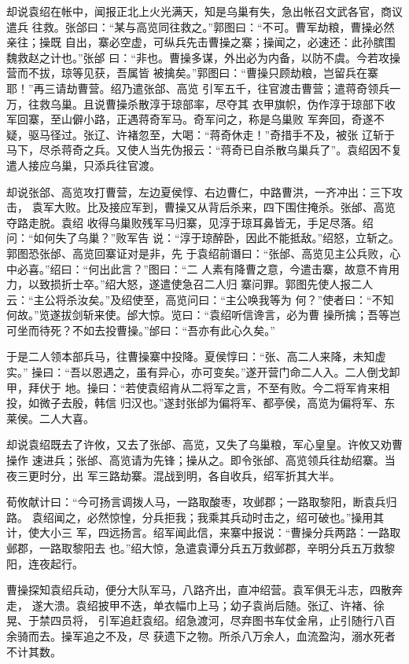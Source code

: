 却说袁绍在帐中，闻报正北上火光满天，知是乌巢有失，急出帐召文武各官，商议遣兵
往救。张郃曰：“某与高览同往救之。”郭图曰：“不可。曹军劫粮，曹操必然亲往；操既
自出，寨必空虚，可纵兵先击曹操之寨；操闻之，必速还：此孙膑围魏救赵之计也。”张邰
曰：“非也。曹操多谋，外出必为内备，以防不虞。今若攻操营而不拔，琼等见获，吾属皆
被擒矣。”郭图曰：“曹操只顾劫粮，岂留兵在寨耶！”再三请劫曹营。绍乃遣张郃、高览
引军五千，往官渡击曹营；遣蒋奇领兵一万，往救乌巢。且说曹操杀散淳于琼部率，尽夺其
衣甲旗帜，伪作淳于琼部下收军回寨，至山僻小路，正遇蒋奇军马。奇军问之，称是乌巢败
军奔回，奇遂不疑，驱马径过。张辽、许褚忽至，大喝：“蒋奇休走！”奇措手不及，被张
辽斩于马下，尽杀蒋奇之兵。又使人当先伪报云：“蒋奇已自杀散乌巢兵了”。袁绍因不复
遣人接应乌巢，只添兵往官渡。

却说张郃、高览攻打曹营，左边夏侯惇、右边曹仁，中路曹洪，一齐冲出：三下攻击，
袁军大败。比及接应军到，曹操又从背后杀来，四下围住掩杀。张邰、高览夺路走脱。袁绍
收得乌巢败残军马归寨，见淳于琼耳鼻皆无，手足尽落。绍问：“如何失了乌巢？”败军告
说：“淳于琼醉卧，因此不能抵敌。”绍怒，立斩之。郭图恐张邰、高览回寨证对是非，先
于袁绍前谮曰：“张邰、高览见主公兵败，心中必喜。”绍曰：“何出此言？”图曰：“二
人素有降曹之意，今遣击寨，故意不肯用力，以致损折士卒。”绍大怒，遂遣使急召二人归
寨问罪。郭图先使人报二人云：“主公将杀汝矣。”及绍使至，高览问曰：“主公唤我等为
何？”使者曰：“不知何故。”览遂拔剑斩来使。邰大惊。览曰：“袁绍听信谗言，必为曹
操所擒；吾等岂可坐而待死？不如去投曹操。”邰曰：“吾亦有此心久矣。”

于是二人领本部兵马，往曹操寨中投降。夏侯惇曰：“张、高二人来降，未知虚实。”
操曰：“吾以恩遇之，虽有异心，亦可变矣。”遂开营门命二人入。二人倒戈卸甲，拜伏于
地。操曰：“若使袁绍肯从二将军之言，不至有败。今二将军肯来相投，如微子去殷，韩信
归汉也。”遂封张邰为偏将军、都亭侯，高览为偏将军、东莱侯。二人大喜。

却说袁绍既去了许攸，又去了张邰、高览，又失了乌巢粮，军心皇皇。许攸又劝曹操作
速进兵；张邰、高览请为先锋；操从之。即令张邰、高览领兵往劫绍寨。当夜三更时分，出
军三路劫寨。混战到明，各自收兵，绍军折其大半。

荀攸献计曰：“今可扬言调拨人马，一路取酸枣，攻邺郡；一路取黎阳，断袁兵归路。
袁绍闻之，必然惊惶，分兵拒我；我乘其兵动时击之，绍可破也。”操用其计，使大小三
军，四远扬言。绍军闻此信，来寨中报说：“曹操分兵两路：一路取邺郡，一路取黎阳去
也。”绍大惊，急遣袁谭分兵五万救邺郡，辛明分兵五万救黎阳，连夜起行。

曹操探知袁绍兵动，便分大队军马，八路齐出，直冲绍营。袁军俱无斗志，四散奔走，
遂大溃。袁绍披甲不迭，单衣幅巾上马；幼子袁尚后随。张辽、许褚、徐晃、于禁四员将，
引军追赶袁绍。绍急渡河，尽弃图书车仗金帛，止引随行八百余骑而去。操军追之不及，尽
获遗下之物。所杀八万余人，血流盈沟，溺水死者不计其数。


